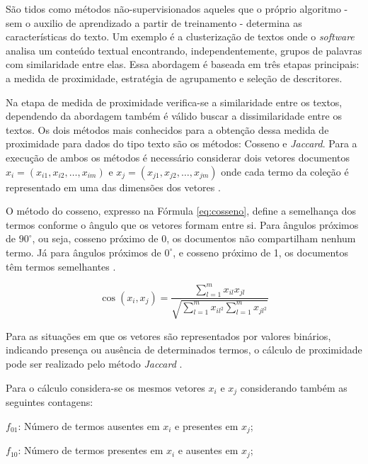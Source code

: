 
São tidos como métodos não-supervisionados aqueles que o próprio algoritmo - sem o auxilio de aprendizado a partir de treinamento - determina as características do texto. Um exemplo é a clusterização de textos onde o \textit{software} analisa um conteúdo textual encontrando, independentemente, grupos de palavras com similaridade entre elas. Essa abordagem é baseada em três etapas principais: a medida de proximidade, estratégia de agrupamento e seleção de descritores.

Na etapa de medida de proximidade verifica-se a similaridade entre os textos, dependendo da abordagem também é válido buscar a dissimilaridade entre os textos. Os dois métodos mais conhecidos para a obtenção dessa medida de proximidade para dados do tipo texto são os métodos: Cosseno e \textit{Jaccard}. Para a execução de ambos os métodos é necessário considerar dois vetores documentos $x_{i}=\left ( x_{i1}, x_{i2}, \dotsc, x_{im}\right )$ e $x_{j}=\left ( x_{j1}, x_{j2}, \dotsc, x_{jm}\right )$ onde cada termo da coleção é representado em uma das dimensões dos vetores \cite{Rezende2011}.

O método do cosseno, expresso na Fórmula \ref{eq:cosseno}, define a semelhança dos termos conforme o ângulo que os vetores formam entre si. Para ângulos próximos de $90^{\circ}$, ou seja, cosseno próximo de 0, os documentos não compartilham nenhum termo. Já para ângulos próximos de $0^{\circ}$, e  cosseno próximo de 1, os documentos têm termos semelhantes \cite{Rezende2011}.

\begin{equation}
    \label{eq:cosseno}
     \cos \left ( x_{i},x_{j} \right ) = \frac{\sum_{l=1}^{m} x_{il} x_{jl}}{\sqrt{\sum_{l=1}^{m} x_{il^{2}} \sum_{l=1}^{m} x_{jl^{2}}} }
\end{equation}

Para as situações em que os vetores são representados por valores binários, indicando presença ou ausência de determinados termos, o cálculo de proximidade pode ser realizado pelo método \textit{Jaccard} \cite{Rezende2011}.

Para o cálculo considera-se os mesmos vetores $x_{i}$ e $x_{j}$  considerando também as seguintes contagens:

$f_{01}$: Número de termos ausentes em $x_{i}$ e presentes em $x_{j}$;

$f_{10}$: Número de termos presentes em $x_{i}$ e ausentes em $x_{j}$;

